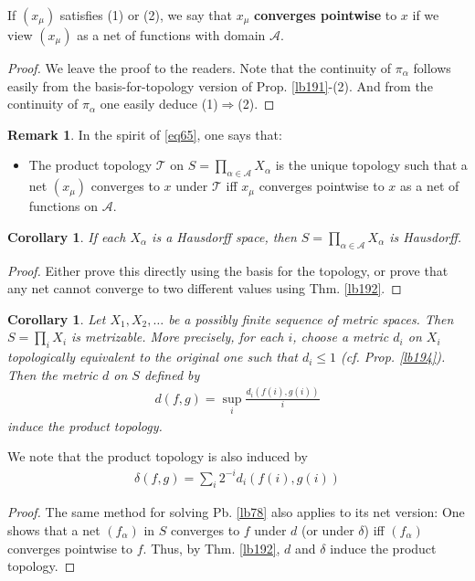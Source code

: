 \documentclass[12pt,b5paper,notitlepage]{article}
\theoremstyle{definition}
\newtheorem{rem}[df]{Remark}
\theoremstyle{plain}
\newtheorem{co}[df]{Corollary}
\newcommand{\mc}{\mathcal}
\newcommand{\scr}{\mathscr}
\numberwithin{equation}{section}
\begin{document}
If $(x_\mu)$ satisfies (1) or (2), we say that $x_\mu$ \textbf{converges pointwise}  to $x$ if we view $(x_\mu)$ as a net of functions with domain $\scr A$. 

\begin{proof}
We leave the proof to the readers. Note that the continuity of $\pi_\alpha$ follows easily from the basis-for-topology version of Prop. \ref{lb191}-(2). And from the continuity of $\pi_\alpha$ one easily deduce (1)$\Rightarrow$(2).
\end{proof}

\begin{rem}
In the spirit of \eqref{eq65}, one says that:
\begin{itemize}
\item The product topology $\mc T$ on $S=\prod_{\alpha\in\scr A}X_\alpha$ is the unique topology such that a net $(x_\mu)$ converges to $x$ under $\mc T$ iff $x_\mu$ converges pointwise to $x$ as a net of functions on $\scr A$.
\end{itemize}
\end{rem}


\begin{co}
If each $X_\alpha$ is a Hausdorff space, then $S=\prod_{\alpha\in\scr A}X_\alpha$ is Hausdorff.
\end{co}

\begin{proof}
Either prove this directly using the basis for the topology, or prove that any net cannot converge to two different values using Thm. \ref{lb192}.
\end{proof}

\begin{co}\label{lb260}
Let $X_1,X_2,\dots$ be a possibly finite sequence of metric spaces. Then $S=\prod_i X_i$ is metrizable. More precisely, for each $i$, choose a metric $d_i$ on $X_i$ topologically equivalent to the original one such that $d_i\leq 1$ (cf. Prop. \ref{lb194}). Then the metric $d$ on $S$ defined by
\begin{align}
d(f,g)=\sup_{i} \frac {d_i(f(i),g(i))}{i} 
\end{align}
induce the product topology.
\end{co}

We note that the product topology is also induced by
\begin{align}
\delta(f,g)=\sum_{i}2^{-i} d_i(f(i),g(i))
\end{align}

\begin{proof}
The same method for solving Pb. \ref{lb78} also applies to its net version: One shows that a net $(f_\alpha)$ in $S$ converges to $f$ under $d$ (or under $\delta$) iff $(f_\alpha)$ converges pointwise to $f$. Thus, by Thm. \ref{lb192}, $d$ and $\delta$ induce the product topology.
\end{proof}
\end{document}
